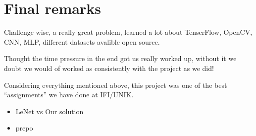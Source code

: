 \documentclass[Report.tex]{subfiles}
\begin{document}
\section{Final remarks}
Challenge wise, a really great problem, learned a lot about TenserFlow, OpenCV,
CNN, MLP, different datasets avalible open source. \par

Thought the time pressure in the end got us really worked up, without it we doubt
we would of worked as consistently with the project as we did! \par

Considering everything mentioned above, this project was one of the best ``assignments'' we have done at IFI/UNIK.

\begin{itemize}
  \item LeNet vs Our solution
  \item prepo
\end{itemize}
\end{document}
